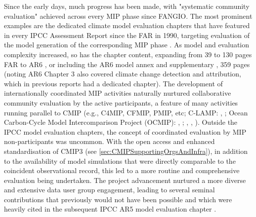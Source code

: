 \documentclass[gmd, preprint]{copernicus}
\begin{document}
Since the early days, much progress has been made, with "systematic community evaluation" achieved across every MIP phase since FANGIO. The most prominent examples are the dedicated climate model evaluation chapters that have featured in every IPCC Assessment Report since the FAR in 1990, targeting evaluation of the model generation of the corresponding MIP phase \citep[e.g.,][]{gates_validation_1990,gates_climate_1996,mcavaney_model_2001,randall_climate_2007,flato_evaluation_2013,eyring_human_2021}. As model and evaluation complexity increased, so has the chapter content, expanding from 39 to 130 pages FAR to AR6  \citep{gates_validation_1990,eyring_human_2021}, or including the AR6 model annex \citep{gutierrez_models_2021} and supplementary \citep{eyring_human_2021-1}, 359 pages (noting AR6 Chapter 3 also covered climate change detection and attribution, which in previous reports had a dedicated chapter). The development of internationally coordinated MIP activities naturally nurtured collaborative community evaluation by the active participants, a feature of many activities running parallel to CMIP (e.g., C4MIP, CFMIP, PMIP, etc; C-LAMP: \citeauthor{hoffman_results_2007}, \citeyear{hoffman_results_2007}; Ocean Carbon-Cycle Model Intercomparison Project (OCMIP): \citeauthor{orr_ocean_1999}, \citeyear{orr_ocean_1999}; \citeauthor{dutay_evaluation_2002}, \citeyear{dutay_evaluation_2002}, 
\citeyear{dutay_evaluation_2004}). Outside the IPCC model evaluation chapters, the concept of coordinated evaluation by MIP non-participants was uncommon. With the open access and enhanced standardisation of CMIP3 (see \autoref{sec:CMIPSupportingOrgsAndInfra}), in addition to the availability of model simulations that were directly comparable to the coincident observational record, this led to a more routine and comprehensive evaluation being undertaken. The project advancement nurtured a more diverse and extensive data user group engagement, leading to several seminal contributions that previously would not have been possible \citep{gleckler_performance_2008,eyring_assessment_2006,waugh_quantitative_2008} and which were heavily cited in the subsequent IPCC AR5 model evaluation chapter \citep{flato_evaluation_2013}.
\end{document}
